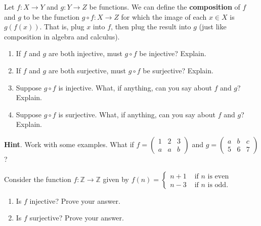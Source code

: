 \documentclass[10pt,]{book}
\newcommand{\terminology}[1]{\textbf{#1}}
\theoremstyle{plain}
\theoremstyle{definition}
\theoremstyle{definition}
\theoremstyle{definition}
\theoremstyle{definition}
\numberwithin{equation}{chapter}
\def\Z{\mathbb Z}
\newcommand{\twoline}[2]{\begin{pmatrix}#1 \\ #2 \end{pmatrix}}
\newcommand{\amp}{&}
\begin{document}
\begin{divisionexercise}{13}\hypertarget{exercise-215}{}
\hypertarget{p-1756}{}%
Let \(f:X \to Y\) and \(g:Y \to Z\) be functions.  We can define the \terminology{composition} of \(f\) and \(g\) to be the function \(g\circ f:X \to Z\) for which the image of each \(x \in X\) is \(g(f(x))\).  That is, plug \(x\) into \(f\), then plug the result into \(g\) (just like composition in algebra and calculus).%
\par
\hypertarget{p-1757}{}%
\leavevmode%
\begin{enumerate}[label=(\alph*)]
\item\hypertarget{li-629}{}\hypertarget{p-1758}{}%
If \(f\) and \(g\) are both injective, must \(g\circ f\) be injective?  Explain.%
\item\hypertarget{li-630}{}\hypertarget{p-1759}{}%
If \(f\) and \(g\) are both surjective, must \(g\circ f\) be surjective?  Explain.%
\item\hypertarget{li-631}{}\hypertarget{p-1760}{}%
Suppose \(g\circ f\) is injective.  What, if anything, can you say about \(f\) and \(g\)?  Explain.%
\item\hypertarget{li-632}{}\hypertarget{p-1761}{}%
Suppose \(g\circ f\) is surjective.  What, if anything, can you say about \(f\) and \(g\)?  Explain.%
\end{enumerate}
%
\par\smallskip%
\noindent\textbf{Hint}.\hypertarget{hint-70}{}\quad%
\hypertarget{p-1762}{}%
Work with some examples.  What if \(f = \twoline{1\amp 2 \amp 3}{a \amp a \amp b}\) and \(g = \twoline{a\amp b \amp c}{5 \amp 6 \amp 7}\)?%
\end{divisionexercise}%
\begin{divisionexercise}{14}\hypertarget{exercise-216}{}
\hypertarget{p-1768}{}%
Consider the function \(f:\Z \to \Z\) given by \(f(n) = \begin{cases}n+1 \amp  \text{ if }n\text{ is even} \\ n-3 \amp \text{ if }n\text{ is odd} . \end{cases}\) \leavevmode%
\begin{enumerate}[label=(\alph*)]
\item\hypertarget{li-637}{}\hypertarget{p-1769}{}%
Is \(f\) injective? Prove your answer.%
\item\hypertarget{li-638}{}\hypertarget{p-1770}{}%
Is \(f\) surjective? Prove your answer.%
\end{enumerate}
%
\end{divisionexercise}%
\end{document}
